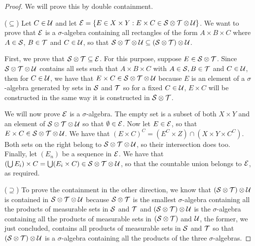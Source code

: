 \begin{proof}
We will prove this by double containment.

($\subseteq$)
Let $C \in \mathcal{U}$ and let $\mathcal{E} = \{E \in X \times Y: E \times C \in \mathcal{S} \otimes \mathcal{T} \otimes \mathcal{U}\}$.
We want to prove that $\mathcal{E}$ is a $\sigma$-algebra containing all rectangles of the form $A \times B \times C$ where $A \in \mathcal{S}$, $B \in \mathcal{T}$ and $C \in \mathcal{U}$, so that $\mathcal{S} \otimes \mathcal{T} \otimes \mathcal{U} \subseteq (\mathcal{S} \otimes \mathcal{T}) \otimes \mathcal{U}$.

First, we prove that $\mathcal{S} \otimes \mathcal{T} \subseteq \mathcal{E}$.
For this purpose, suppose $E \in \mathcal{S} \otimes \mathcal{T}$.
Since $\mathcal{S} \otimes \mathcal{T} \otimes \mathcal{U}$ contains all sets such that $A \times B \times C$ with $A \in \mathcal{S}, B \in \mathcal{T}$ and $C \in \mathcal{U}$, then for $C \in \mathcal{U}$, we have that $E \times C \in \mathcal{S} \otimes \mathcal{T} \otimes \mathcal{U}$ because $E$ is an element of a $\sigma$-algebra generated by sets in $\mathcal{S}$ and $\mathcal{T}$ so for a fixed $C \in \mathcal{U}$, $E \times C$ will be constructed in the same way it is constructed in $\mathcal{S} \otimes \mathcal{T}$.

We will now prove $\mathcal{E}$ is a $\sigma$-algebra.
The empty set is a subset of both $X \times Y$ and an element of $\mathcal{S} \otimes \mathcal{T} \otimes \mathcal{U}$ so that $\emptyset \in \mathcal{E}$.
Now let $E \in \mathcal{E}$, so that $E \times C \in \mathcal{S} \otimes \mathcal{T} \otimes \mathcal{U}$.
We have that $(E \times C)^C = (E^C \times Z) \cap (X \times Y \times C^C)$.
Both sets on the right belong to $\mathcal{S} \otimes \mathcal{T} \otimes \mathcal{U}$, so their intersection does too.
Finally, let $(E_n)$ be a sequence in $\mathcal{E}$.
We have that $(\bigcup E_i) \times C = \bigcup (E_i \times C) \in \mathcal{S} \otimes \mathcal{T} \otimes \mathcal{U}$, so that the countable union belongs to $\mathcal{E}$, as required.

($\supseteq$) To prove the containment in the other direction, we know that $(\mathcal{S} \otimes \mathcal{T}) \otimes \mathcal{U}$ is contained in $\mathcal{S} \otimes \mathcal{T} \otimes \mathcal{U}$ because $\mathcal{S} \otimes \mathcal{T}$ is the smallest $\sigma$-algebra containing all the products of measurable sets in $\mathcal{S}$ and $\mathcal{T}$ and $(\mathcal{S} \otimes \mathcal{T}) \otimes \mathcal{U}$ is the $\sigma$-algebra containing all the products of measurable sets in $(\mathcal{S} \otimes \mathcal{T})$ and $\mathcal{U}$, the former, we just concluded, contains all products of measurable sets in $\mathcal{S}$ and $\mathcal{T}$ so that $(\mathcal{S} \otimes \mathcal{T}) \otimes \mathcal{U}$ is a $\sigma$-algebra containing all the products of the three $\sigma$-algebras.
\end{proof} 

